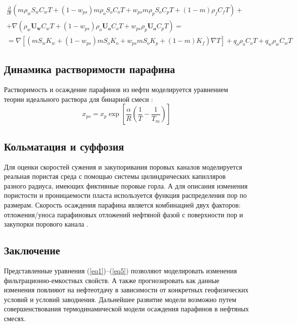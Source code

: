 \documentclass[a4paper,12pt]{article}
\begin{document}
\begin{multline}\label{eq4}
\frac{\partial }
{\partial t}(m \rho_w S_w C_w T +(1-w_{ps})m \rho_o S_o C_o T + 
w_{ps}m \rho_p S_o C_p T +(1-m) \rho_f C_f T) + 
\\
+\nabla(\rho_w \mathbf{U_w} C_w T + (1-w_{ps}) \rho_o \mathbf{U_o} C_o T + w_{ps}\rho_p \mathbf{U_o} C_p T) = 
\\
=\nabla [(m S_w K_w + (1-w_{ps}) m S_o K_o  + w_{ps} m S_o K_p + (1-m) K_f) \nabla T ] + q_o \rho_o C_o T + q_w \rho_w C_w T
\end{multline}

\vspace{2em}
{\subsection*{\normalsize Динамика растворимости парафина}}
Растворимость и осаждение парафинов из нефти моделируется уравнением теории идеального раствора для бинарной смеси \cite{bib:04}:
\begin{equation} \label{eq5}
x_{ps} = x_p \exp[\frac{\alpha}{R}(\frac{1}{T} - \frac{1}{T_m})] 
\end{equation}

\vspace{2em}
{\subsection*{\normalsize Кольматация и суффозия}}
	 Для оценки скоростей сужения и закупоривания поровых каналов моделируется реальная  пористая среда с помощью системы цилиндрических капилляров разного радиуса, имеющих фиктивные поровые горла. А для описания изменения пористости и проницаемости пласта используется функция распределения пор по размерам. Скорость осаждения парафина является комбинацией двух факторов: отложения/уноса парафиновых отложений нефтяной фазой с поверхности пор и закупорки порового канала \cite{bib:05}.

\vspace{2em}
{\subsection*{\normalsize Заключение}}
	Представленные уравнения (\ref{eq1})--(\ref{eq5}) позволяют моделировать изменения фильтрационно-емкостных свойств. А также прогнозировать как данные изменения повлияют на нефтеотдачу в зависимости от конкретных геофизических условий и условий заводнения. Дальнейшее развитие модели возможно путем совершенствования термодинамической модели осаждения парафинов в нефтяных смесях.
\end{document}
